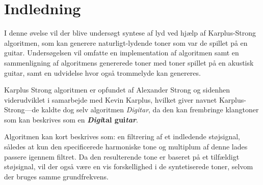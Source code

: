 \section{Indledning}

I denne øvelse vil der blive undersøgt syntese af lyd ved hjælp af Karplus-Strong algoritmen, som kan generere naturligt-lydende toner som var de spillet på en guitar.
Undersøgelsen vil omfatte en implementation af algoritmen samt en sammenligning af algoritmens genererede toner med toner spillet på en akustisk guitar, samt en udvidelse hvor også trommelyde kan genereres.

Karplus Strong algoritmen er opfundet af Alexander Strong og sidenhen viderudviklet i samarbejde med Kevin Karplus\cite{Karplus1983}, hvilket giver navnet Karplus-Strong---de kaldte dog selv algoritmen \emph{Digitar}, da den kan frembringe klangtoner som kan beskrives som en \textbf{\emph{Digi}tal gui\emph{tar}}.

Algoritmen kan kort beskrives som: en filtrering af et indledende støjsignal, således at kun den specificerede harmoniske tone og multiplum af denne lades passere igennem filtret.
Da den resulterende tone er baseret på et tilfældigt støjsignal, vil der også være en vis forskellighed i de syntetiserede toner, selvom der bruges samme grundfrekvens.
